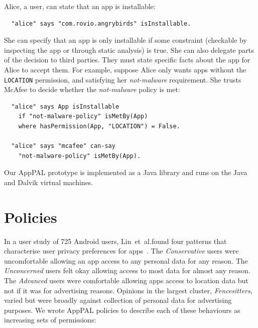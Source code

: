 \documentclass[]{soups-poster}
\makeatletter
\newcommand{\etal}[0]{et~al{.}\@ }
\newcommand{\citep}[1]{\cite{#1}}
\makeatother
\begin{document}
Alice, a user, can state that an app is installable:
\begin{lstlisting}
  "alice" says "com.rovio.angrybirds" isInstallable.
\end{lstlisting}
She can specify that an app is only installable if some constraint (checkable by inspecting the app or through static analysis) is true.
She can also delegate parts of the decision to third parties.
They must state specific facts about the app for Alice to accept them.
For example, suppose Alice only wants apps without the \texttt{LOCATION} permission,
and satisfying her \emph{not-malware} requirement.
She trusts McAfee to decide whether the \emph{not-malware} policy is met:
\begin{lstlisting}
  "alice" says App isInstallable
    if "not-malware-policy" isMetBy(App)
    where hasPermission(App, "LOCATION") = False.

  "alice" says "mcafee" can-say
    "not-malware-policy" isMetBy(App).
\end{lstlisting}

Our AppPAL prototype is implemented as a Java library and runs on the
Java and Dalvik virtual machines.

\section{Policies}

In a user study of 725 Android users, Lin~\etal found four patterns that characterise user privacy preferences for apps~\citep{Sadeh:2014vq}.
The \emph{Conservative} users were uncomfortable allowing an app access to any personal data for any reason.
The \emph{Unconcerned} users felt okay allowing access to most data for almost any reason.
The \emph{Advanced} users were comfortable allowing apps access to location data but not if it was for advertising reasons.
Opinions in the largest cluster, \emph{Fencesitters}, varied but were broadly against collection of personal data for advertising purposes.
We wrote AppPAL policies to describe each of these behaviours as increasing sets of permissions:
\end{document}

